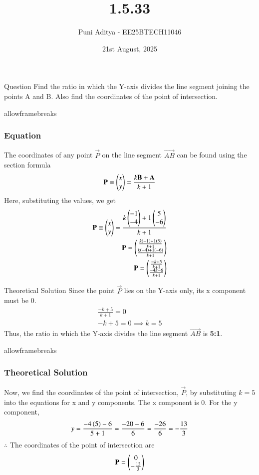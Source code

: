 \documentclass{beamer}
\title{1.5.33}
\date{21st August, 2025}
\author{Puni Aditya - EE25BTECH11046}
\begin{document}
\frame{\titlepage}
\begin{frame}{Question}
Find the ratio in which the Y-axis divides the line segment joining the points A and B. Also find the coordinates of the point of intersection.
\end{frame}

\begin{frame}{allowframebreaks}
\frametitle{Equation}
The coordinates of any point $\vec{P}$ on the line segment $\vec{AB}$ can be found using the section formula
\begin{align}
    \mathbf{P} \equiv \begin{pmatrix}x \\ y\end{pmatrix} = \frac{k\mathbf{B} + \mathbf{A}}{k+1}
\end{align}
Here, substituting the values, we get
\begin{align}
    \mathbf{P} \equiv \begin{pmatrix}x \\ y\end{pmatrix} = \frac{k\begin{pmatrix}-1 \\ -4\end{pmatrix}+1\begin{pmatrix}5 \\ -6\end{pmatrix}}{k+1} \\
    \mathbf{P} = \begin{pmatrix}\frac{k\left(-1\right) + 1\left(5\right)}{k+1} \\ \frac{k\left(-4\right) + 1\left(-6\right)}{k+1}\end{pmatrix} \\
    \mathbf{P} = \begin{pmatrix}\frac{-k+5}{k+1} \\ \frac{-4k-6}{k+1}\end{pmatrix}
\end{align}
\end{frame}

\begin{frame}{Theoretical Solution}
Since the point $\vec{P}$ lies on the Y-axis only, its x component must be 0.
\begin{align}
    \frac{-k+5}{k+1} = 0 \\
    -k + 5 = 0 \implies k = 5
\end{align}
Thus, the ratio in which the Y-axis divides the line segment $\vec{AB}$ is \textbf{5:1}.
\end{frame}

\begin{frame}{allowframebreaks}
\frametitle{Theoretical Solution}
Now, we find the coordinates of the point of intersection, $\vec{P}$, by substituting $k=5$ into the equations for x and y components.
The x component is 0. For the y component,
\begin{align}
    y = \frac{-4\left(5\right) - 6}{5+1} = \frac{-20 - 6}{6} = \frac{-26}{6} = -\frac{13}{3}
\end{align}
$\therefore$ The coordinates of the point of intersection are 
\begin{align*}
\mathbf{P} = \begin{pmatrix}0 \\ -\frac{13}{3}\end{pmatrix}
\end{align*}
\end{frame}
\end{document}
